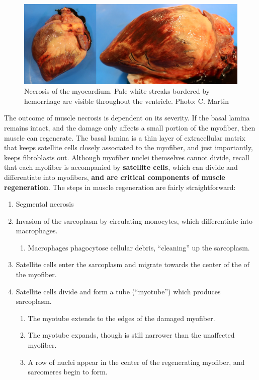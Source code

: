 \documentclass[openany]{book}
\providecommand{\tightlist}{%
  \setlength{\itemsep}{0pt}\setlength{\parskip}{0pt}}
\begin{document}
\begin{figure}

{\centering \includegraphics[width=0.6\linewidth]{images/heart-necrosis-comp} 

}

\caption{Necrosis of the myocardium. Pale white streaks bordered by hemorrhage are visible throughout the ventricle. Photo: C. Martin}\label{fig:heart-necrosis}
\end{figure}

The outcome of muscle necrosis is dependent on its severity. If the
basal lamina remains intact, and the damage only affects a small portion
of the myofiber, then muscle can regenerate. The basal lamina is a thin
layer of extracellular matrix that keeps satellite cells closely
associated to the myofiber, and just importantly, keeps fibroblasts out.
Although myofiber nuclei themselves cannot divide, recall that each
myofiber is accompanied by \textbf{satellite cells}, which can divide
and differentiate into myofibers, \textbf{and are critical components of
muscle regeneration}. The steps in muscle regeneration are fairly
straightforward:

\begin{enumerate}
\def\labelenumi{\arabic{enumi}.}
\tightlist
\item
  Segmental necrosis
\item
  Invasion of the sarcoplasm by circulating monocytes, which
  differentiate into macrophages.

  \begin{enumerate}
  \def\labelenumii{\roman{enumii})}
  \tightlist
  \item
    Macrophages phagocytose cellular debris, ``cleaning'' up the
    sarcoplasm.
  \end{enumerate}
\item
  Satellite cells enter the sarcoplasm and migrate towards the center of
  the of the myofiber.
\item
  Satellite cells divide and form a tube (``myotube'') which produces
  sarcoplasm.

  \begin{enumerate}
  \def\labelenumii{\roman{enumii})}
  \tightlist
  \item
    The myotube extends to the edges of the damaged myofiber.
  \item
    The myotube expands, though is still narrower than the unaffected
    myofiber.
  \item
    A row of nuclei appear in the center of the regenerating myofiber,
    and sarcomeres begin to form.
  \end{enumerate}
\end{enumerate}
\end{document}
